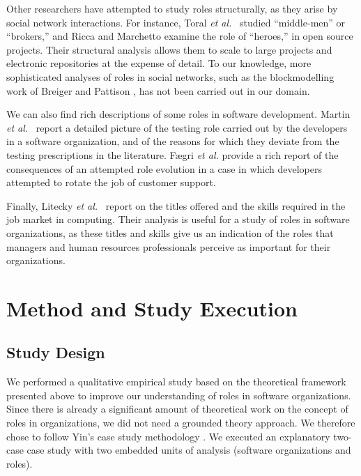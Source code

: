 \documentclass[10pt, conference, compsocconf]{IEEEtran}
\begin{document}
Other researchers have attempted to study roles structurally, as they arise by social network interactions. For instance, Toral \emph{et al.}\ \cite{Toral2010} studied ``middle-men'' or ``brokers,'' and Ricca and Marchetto \cite{Ricca2010} examine the role of ``heroes,'' in open source projects. Their structural analysis allows them to scale to large projects and electronic repositories at the expense of detail. To our knowledge, more sophisticated analyses of roles in social networks, such as the blockmodelling work of Breiger and Pattison \cite{Breiger1986}, has not been carried out in our domain.

We can also find rich descriptions of some roles in software development. Martin \emph{et al.}\ \cite{Martin2007} report a detailed picture of the testing role carried out by the developers in a software organization, and of the reasons for which they deviate from the testing prescriptions in the literature. F{\ae}gri \emph{et al.} \cite{Faegri2010} provide a rich report of the consequences of an attempted role evolution in a case in which developers attempted to rotate the job of customer support.

Finally, Litecky \emph{et al.}\ \cite{Litecky2010} report on the titles offered and the skills required in the job market in computing. Their analysis is useful for a study of roles in software organizations, as these titles and skills give us an indication of the roles that managers and human resources professionals perceive as important for their organizations.






\section{Method and Study Execution}

\subsection{Study Design}

We performed a qualitative empirical study based on the theoretical framework presented above to improve our understanding of roles in software organizations. Since there is already a significant amount of theoretical work on the concept of roles in organizations, we did not need a grounded theory approach. We therefore chose to follow Yin's case study methodology \cite{Yin2003}. We executed an explanatory two-case case study with two embedded units of analysis (software organizations and roles).
\end{document}
